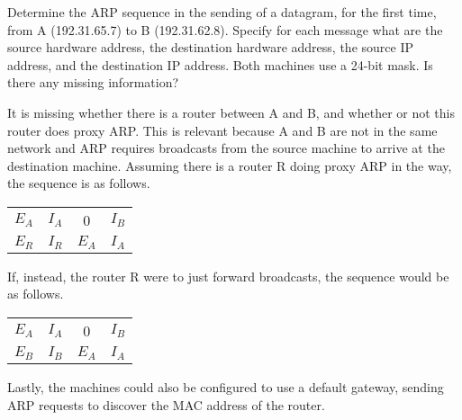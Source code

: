 \begin{Exercise}
Determine the ARP sequence in the sending of a datagram, for the first time, from A (192.31.65.7) to B (192.31.62.8).
Specify for each message what are the source hardware address, the destination hardware address, the source IP address, and the destination IP address.
Both machines use a 24-bit mask. Is there any missing information?
\end{Exercise}
\begin{Answer}
It is missing whether there is a router between A and B, and whether or not this router does proxy ARP.
This is relevant because A and B are not in the same network and ARP requires broadcasts from the source machine to arrive at the destination machine.
Assuming there is a router R doing proxy ARP in the way, the sequence is as follows.

\begin{center}
\begin{tabular}{c|c|c|c}
    \(E_A\) & \(I_A\) &       0 & \(I_B\) \\
    \(E_R\) & \(I_R\) & \(E_A\) & \(I_A\) \\
\end{tabular}
\end{center}

If, instead, the router R were to just forward broadcasts, the sequence would be as follows.

\begin{center}
\begin{tabular}{c|c|c|c}
    \(E_A\) & \(I_A\) &       0 & \(I_B\) \\
    \(E_B\) & \(I_B\) & \(E_A\) & \(I_A\) \\
\end{tabular}
\end{center}

Lastly, the machines could also be configured to use a default gateway, sending ARP requests to discover the MAC address of the router.
\end{Answer}

